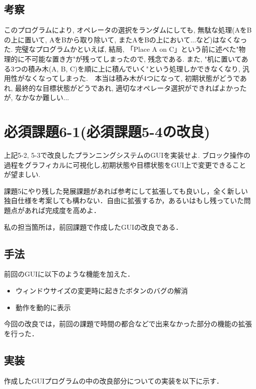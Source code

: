 \documentclass[12pt]{jarticle}
\begin{document}
\subsection{考察}
このプログラムにより, オペレータの選択をランダムにしても, 無駄な処理(AをBの上に置いて, AをBから取り除いて, またAをBの上において...など)はなくなった. 完璧なプログラムかといえば, 結局, 「Place A on C」という前に述べた"物理的に不可能な置き方"が残ってしまったので, 残念である. また, "机に置いてある3つの積み木(A, B, C)を順に上に積んでいく"という処理しかできなくなり, 汎用性がなくなってしまった.　本当は積み木が4つになって, 初期状態がどうであれ, 最終的な目標状態がどうであれ, 適切なオペレータ選択ができればよかったが, なかなか難しい...



\section{必須課題6-1(必須課題5-4の改良)}
\begin{screen}
上記5-2, 5-3で改良したプランニングシステムのGUIを実装せよ.
ブロック操作の過程をグラフィカルに可視化し,初期状態や目標状態をGUI上で変更できることが望ましい.
\end{screen}
\begin{screen}
課題5にやり残した発展課題があれば参考にして拡張しても良いし，全く新しい独自仕様を考案しても構わない．自由に拡張するか，あるいはもし残っていた問題点があれば完成度を高めよ．
\end{screen}
私の担当箇所は，前回課題で作成したGUIの改良である．

\subsection{手法}
前回のGUIに以下のような機能を加えた．

\begin{itemize}
\item ウィンドウサイズの変更時に起きたボタンのバグの解消
\item 動作を動的に表示

\end{itemize}

今回の改良では，前回の課題で時間の都合などで出来なかった部分の機能の拡張を行った．

\subsection{実装}
作成したGUIプログラムの中の改良部分についての実装を以下に示す．\\
\end{document}
